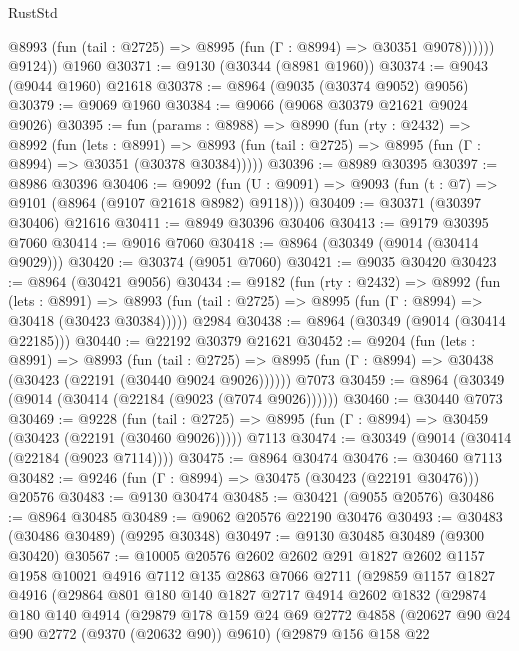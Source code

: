 \begin{lexlean}{RustStd}
\begin{coremodule}
              @8993 (fun (tail : @2725) => @8995 (fun (Γ : @8994) => @30351 @9078))))))
        @9124))
    @1960
@30371 := @9130 (@30344 (@8981 @1960))
@30374 := @9043 (@9044 @1960) @21618
@30378 := @8964 (@9035 (@30374 @9052) @9056)
@30379 := @9069 @1960
@30384 := @9066 (@9068 @30379 @21621 @9024 @9026)
@30395 := fun (params : @8988) =>
  @8990
    (fun (rty : @2432) =>
    @8992
      (fun (lets : @8991) =>
      @8993 (fun (tail : @2725) => @8995 (fun (Γ : @8994) => @30351 (@30378 @30384)))))
@30396 := @8989 @30395
@30397 := @8986 @30396
@30406 := @9092
    (fun (U : @9091) => @9093 (fun (t : @7) => @9101 (@8964 (@9107 @21618 @8982) @9118)))
@30409 := @30371 (@30397 @30406) @21616
@30411 := @8949 @30396 @30406
@30413 := @9179 @30395 @7060
@30414 := @9016 @7060
@30418 := @8964 (@30349 (@9014 (@30414 @9029)))
@30420 := @30374 (@9051 @7060)
@30421 := @9035 @30420
@30423 := @8964 (@30421 @9056)
@30434 := @9182
    (fun (rty : @2432) =>
    @8992
      (fun (lets : @8991) =>
      @8993 (fun (tail : @2725) => @8995 (fun (Γ : @8994) => @30418 (@30423 @30384)))))
    @2984
@30438 := @8964 (@30349 (@9014 (@30414 @22185)))
@30440 := @22192 @30379 @21621
@30452 := @9204
    (fun (lets : @8991) =>
    @8993
      (fun (tail : @2725) =>
      @8995 (fun (Γ : @8994) => @30438 (@30423 (@22191 (@30440 @9024 @9026))))))
    @7073
@30459 := @8964 (@30349 (@9014 (@30414 (@22184 (@9023 (@7074 @9026))))))
@30460 := @30440 @7073
@30469 := @9228
    (fun (tail : @2725) => @8995 (fun (Γ : @8994) => @30459 (@30423 (@22191 (@30460 @9026)))))
    @7113
@30474 := @30349 (@9014 (@30414 (@22184 (@9023 @7114))))
@30475 := @8964 @30474
@30476 := @30460 @7113
@30482 := @9246 (fun (Γ : @8994) => @30475 (@30423 (@22191 @30476))) @20576
@30483 := @9130 @30474
@30485 := @30421 (@9055 @20576)
@30486 := @8964 @30485
@30489 := @9062 @20576 @22190 @30476
@30493 := @30483 (@30486 @30489) (@9295 @30348)
@30497 := @9130 @30485 @30489 (@9300 @30420)
@30567 := @10005
    @20576
    @2602
    @2602
    @291
    @1827
    @2602
    @1157
    @1958
    @10021
    @4916
    @7112
    @135
    @2863
    @7066
    @2711
    (@29859
      @1157
      @1827
      @4916
      (@29864
        @801
        @180
        @140
        @1827
        @2717
        @4914
        @2602
        @1832
        (@29874
          @180
          @140
          @4914
          (@29879
            @178
            @159
            @24
            @69
            @2772
            @4858
            (@20627 @90 @24 @90 @2772 (@9370 (@20632 @90)) @9610)
            (@29879
              @156
              @158
              @22

\end{coremodule}
\end{lexlean}
